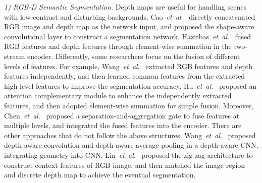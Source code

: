 \documentclass[journal]{IEEEtran}
\newcommand{\etal}{\textit{et~al}.~}
\begin{document}
\textit{1) RGB-D Semantic Segmentation.}
Depth maps are useful for handling scenes with low contrast and disturbing backgrounds.
Cao~\etal\cite{2021ShapeConv} directly concatenated RGB image and depth map as the network input, and proposed the shape-aware convolutional layer to construct a segmentation network.
Hazirbas~\etal\cite{2016FuseNet} fused RGB features and depth features through element-wise summation in the two-stream encoder.
Differently, some researchers focus on the fusion of different levels of features.
For example, Wang~\etal\cite{2016LCSF} extracted RGB features and depth features independently, and then learned common features from the extracted high-level features to improve the segmentation accuracy.
Hu~\etal\cite{2019ACNet} proposed an attention complementary module to enhance the independently extracted features, and then adopted element-wise summation for simple fusion.
Moreover, Chen~\etal\cite{2020SA-Gate} proposed a separation-and-aggregation gate to fuse features at multiple levels, and integrated the fused features into the encoder.
There are other approaches that do not follow the above structures.
Wang~\etal\cite{2018D-CNN} proposed depth-aware convolution and depth-aware average pooling in a depth-aware CNN, integrating geometry into CNN.
Lin~\etal\cite{2020ZigZag} proposed the zig-zag architecture to construct context features of RGB image, and then matched the image region and discrete depth map to achieve the eventual segmentation.
\end{document}
